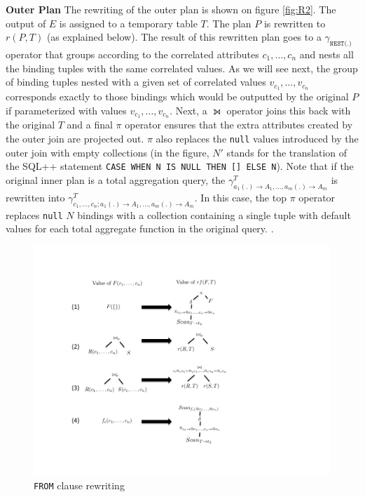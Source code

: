 \textbf{Outer Plan} The rewriting of the outer plan is shown on figure \ref{fig:R2}. The output of $E$ is assigned to a temporary table $T$. The plan $P$ is rewritten to $r(P,T)$ (as explained below). The result of this rewritten plan goes to a $\gamma_{\texttt{NEST(.)}}$ operator that groups according to the correlated attributes $c_1, \dots, c_n$ and nests all the binding tuples with the same correlated values. As we will see next, the group of binding tuples nested with a given set of correlated values $v_{c_1}, \dots, v_{c_n}$ corresponds exactly to those bindings which would be outputted by the original $P$ if parameterized with values  $v_{c_1}, \dots, v_{c_n}$. Next, a $\leftouterjoin$ operator joins this back with the original $T$ and a final $\pi$ operator ensures that the extra attributes created by the outer join are projected out. $\pi$ also replaces the \texttt{null} values introduced by the outer join with empty collections (in the figure, $N'$ stands for the translation of the SQL++ statement \texttt{CASE WHEN N IS NULL THEN [] ELSE N}). Note that if the original inner plan is a total aggregation query, the $\gamma^T_{a_1(.) \rightarrow A_1, \dots, a_m(.) \rightarrow A_m}$ is rewritten into $\gamma^T_{c_1, \dots, c_n; a_1(.) \rightarrow A_1, \dots, a_m(.) \rightarrow A_m}$. In this case, the top $\pi$ operator replaces \texttt{null} $N$ bindings with a collection containing a single tuple with default values for each total aggregate function in the original query. .

\begin{figure}[h]
\centering
\caption{\texttt{FROM} clause rewriting \label{fig:from-items}}
\includegraphics[width=\linewidth]{images/F_RF.pdf}
\end{figure}

